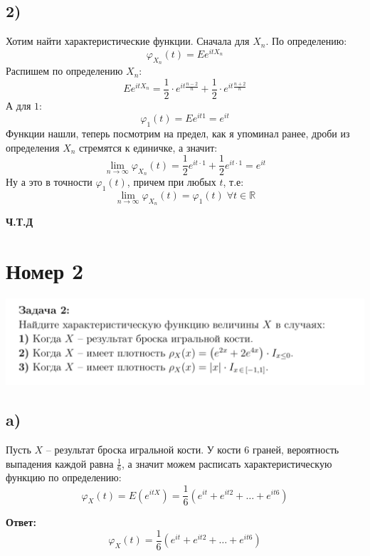 \documentclass[a4paper,12pt]{article}
\begin{document}
\subsection*{2)}
Хотим найти характеристические функции. Сначала для $X_n$. По определению:
\[
\varphi_{X_n}(t) = Ee^{itX_{n}}
\]
Распишем по определению $X_n$:
\[
Ee^{itX_{n}} = 
\frac{1}{2} \cdot e^{it \frac{n - 2}{n}} + \frac{1}{2} \cdot e^{it \frac{n + 2}{n}}
\]
А для $1$:
\[
\varphi_{1}(t) = Ee^{it1} = e^{it}
\]
Функции нашли, теперь посмотрим на предел, как я упоминал ранее, дроби из определения $X_n$ стремятся к единичке, а значит:
\[
\lim_{n \rightarrow \infty} \varphi_{X_n}(t) = \frac{1}{2}e^{it \cdot 1} + \frac{1}{2}e^{it \cdot 1} = e^{it} 
\]
Ну а это в точности $\varphi_1(t)$, причем при любых $t$, т.е:
\[
\lim_{n \rightarrow \infty} \varphi_{X_n}(t) = \varphi_1(t) \; \forall t \in \mathbb{R}
\]
\begin{center}
\textbf{Ч.Т.Д}
\end{center}
\clearpage
\section*{Номер 2}
\begin{center}
\includegraphics[scale=0.6]{2.png}
\end{center}
\subsection*{a)}
Пусть $X$ -- результат броска игральной кости. У кости 6 граней, вероятность выпадения каждой равна $\frac{1}{6}$, а значит можем расписать характеристическую функцию по определению:
\[
\varphi_X(t) = E\left(e^{itX}\right) = \frac{1}{6} \left(
e^{it}
+ e^{it2} 
+
\ldots
+ e^{it6}
\right)
\]
\begin{center}
\textbf{Ответ: } 
\[
\varphi_X(t)  = \frac{1}{6} \left(
e^{it}
+ e^{it2} 
+
\ldots
+ e^{it6}
\right)
\]
\end{center}
\end{document}
